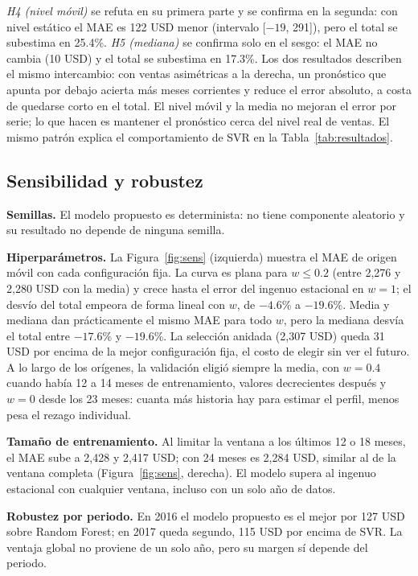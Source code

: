 \documentclass[pdflatex,sn-mathphys-num]{sn-jnl}
\begin{document}
\emph{H4 (nivel móvil)} se refuta en su primera parte y se confirma en la segunda: con nivel estático el MAE es 122 USD menor (intervalo [$-19$, 291]), pero el total se subestima en 25.4\%. \emph{H5 (mediana)} se confirma solo en el sesgo: el MAE no cambia (10 USD) y el total se subestima en 17.3\%. Los dos resultados describen el mismo intercambio: con ventas asimétricas a la derecha, un pronóstico que apunta por debajo acierta más meses corrientes y reduce el error absoluto, a costa de quedarse corto en el total. El nivel móvil y la media no mejoran el error por serie; lo que hacen es mantener el pronóstico cerca del nivel real de ventas. El mismo patrón explica el comportamiento de SVR en la Tabla~\ref{tab:resultados}.

\subsection{Sensibilidad y robustez}\label{subsec:sensibilidad}

\textbf{Semillas.} El modelo propuesto es determinista: no tiene componente aleatorio y su resultado no depende de ninguna semilla.

\textbf{Hiperparámetros.} La Figura~\ref{fig:sens} (izquierda) muestra el MAE de origen móvil con cada configuración fija. La curva es plana para $w\le0.2$ (entre 2{,}276 y 2{,}280 USD con la media) y crece hasta el error del ingenuo estacional en $w=1$; el desvío del total empeora de forma lineal con $w$, de $-4.6$\% a $-19.6$\%. Media y mediana dan prácticamente el mismo MAE para todo $w$, pero la mediana desvía el total entre $-17.6$\% y $-19.6$\%. La selección anidada (2{,}307 USD) queda 31 USD por encima de la mejor configuración fija, el costo de elegir sin ver el futuro. A lo largo de los orígenes, la validación eligió siempre la media, con $w=0.4$ cuando había 12 a 14 meses de entrenamiento, valores decrecientes después y $w=0$ desde los 23 meses: cuanta más historia hay para estimar el perfil, menos pesa el rezago individual.

\textbf{Tamaño de entrenamiento.} Al limitar la ventana a los últimos 12 o 18 meses, el MAE sube a 2{,}428 y 2{,}417 USD; con 24 meses es 2{,}284 USD, similar al de la ventana completa (Figura~\ref{fig:sens}, derecha). El modelo supera al ingenuo estacional con cualquier ventana, incluso con un solo año de datos.

\textbf{Robustez por periodo.} En 2016 el modelo propuesto es el mejor por 127 USD sobre Random Forest; en 2017 queda segundo, 115 USD por encima de SVR. La ventaja global no proviene de un solo año, pero su margen sí depende del periodo.
\end{document}
